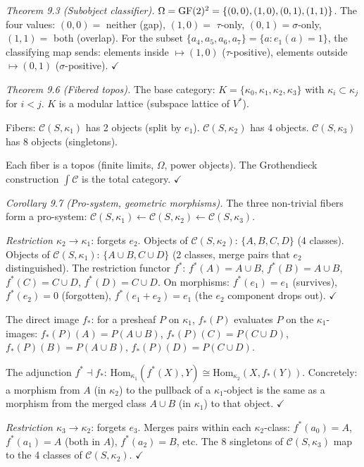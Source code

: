 \emph{Theorem 9.3 (Subobject classifier).}
$\Omega = \operatorname{GF}(2)^2 = \{(0,0), (1,0), (0,1), (1,1)\}$.
The four values: $(0,0) =$ neither (gap), $(1,0) =$
$\tau$-only, $(0,1) = \sigma$-only, $(1,1) =$ both
(overlap). For the subset $\{a_4, a_5, a_6, a_7\}
= \{a : e_1(a) = 1\}$, the classifying map sends:
elements inside $\mapsto (1, 0)$ ($\tau$-positive),
elements outside $\mapsto (0, 1)$ ($\sigma$-positive).
$\checkmark$

\emph{Theorem 9.6 (Fibered topos).}
The base category: $K = \{\kappa_0, \kappa_1, \kappa_2,
\kappa_3\}$ with $\kappa_i \subset \kappa_j$ for
$i < j$. $K$ is a modular lattice (subspace lattice
of $V^*$).

Fibers: $\mathcal{C}(S, \kappa_1)$ has 2 objects (split
by $e_1$). $\mathcal{C}(S, \kappa_2)$ has 4 objects.
$\mathcal{C}(S, \kappa_3)$ has 8 objects (singletons).

Each fiber is a topos (finite limits, $\Omega$, power
objects). The Grothendieck construction
$\int \mathcal{C}$ is the total category. $\checkmark$


\emph{Corollary 9.7 (Pro-system, geometric morphisms).}
The three non-trivial fibers form a pro-system:
$\mathcal{C}(S, \kappa_1) \leftarrow \mathcal{C}(S,
\kappa_2) \leftarrow \mathcal{C}(S, \kappa_3)$.

\emph{Restriction $\kappa_2 \to \kappa_1$}: forgets
$e_2$. Objects of $\mathcal{C}(S, \kappa_2)$:
$\{A, B, C, D\}$ (4 classes). Objects of
$\mathcal{C}(S, \kappa_1)$: $\{A \cup B, C \cup D\}$
(2 classes, merge pairs that $e_2$ distinguished).
The restriction functor $f^*$:
$f^*(A) = A \cup B$, $f^*(B) = A \cup B$,
$f^*(C) = C \cup D$, $f^*(D) = C \cup D$.
On morphisms: $f^*(e_1) = e_1$ (survives),
$f^*(e_2) = 0$ (forgotten), $f^*(e_1{+}e_2) = e_1$
(the $e_2$ component drops out). $\checkmark$

The direct image $f_*$: for a presheaf $P$ on
$\kappa_1$, $f_*(P)$ evaluates $P$ on the
$\kappa_1$-images: $f_*(P)(A) = P(A \cup B)$,
$f_*(P)(C) = P(C \cup D)$, $f_*(P)(B) = P(A \cup B)$,
$f_*(P)(D) = P(C \cup D)$.

The adjunction $f^* \dashv f_*$:
$\mathrm{Hom}_{\kappa_1}(f^*(X), Y) \cong
\mathrm{Hom}_{\kappa_2}(X, f_*(Y))$.
Concretely: a morphism from $A$ (in $\kappa_2$) to
the pullback of a $\kappa_1$-object is the same as a
morphism from the merged class $A \cup B$ (in
$\kappa_1$) to that object. $\checkmark$

\emph{Restriction $\kappa_3 \to \kappa_2$}: forgets
$e_3$. Merges pairs within each $\kappa_2$-class:
$f^*(a_0) = A$, $f^*(a_1) = A$ (both in $A$),
$f^*(a_2) = B$, etc. The 8 singletons of
$\mathcal{C}(S, \kappa_3)$ map to the 4 classes of
$\mathcal{C}(S, \kappa_2)$. $\checkmark$

